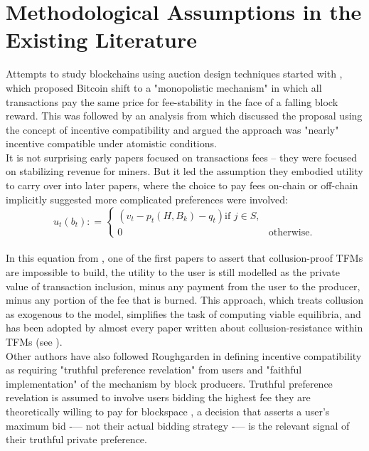 \documentclass[11pt,a4paper]{llncs}
\begin{document}
\section{Methodological Assumptions in the Existing Literature}

Attempts to study blockchains using auction design techniques started with \cite{Lavi2017RedesigningBitcoin}, which proposed Bitcoin shift to a "monopolistic mechanism" in which all transactions pay the same price for fee-stability in the face of a falling block reward. This was followed by an analysis from \cite{Yao2018IncentiveBitcoin} which discussed the proposal using the concept of incentive compatibility and argued the approach was "nearly" incentive compatible under atomistic conditions.
\vspace{0.2cm} \\
It is not surprising early papers focused on transactions fees -- they were focused on stabilizing revenue for miners. But it led the assumption they embodied utility to carry over into later papers, where the choice to pay fees on-chain or off-chain implicitly suggested more complicated preferences were involved:
\vspace{0.2cm} \\
\[
u_t\left(b_t\right) : =
\begin{cases}
\left(
        v_t - p_t\left(H,B_k\right) - q_t
\right) \text{if } j \in S, \\ 0 & \text{otherwise.}
\end{cases}
\]
\vspace{0.2cm} \\
In this equation from \cite{roughgarden2024}, one of the first papers to assert that collusion-proof TFMs are impossible to build, the utility to the user is still modelled as the private value of transaction inclusion, minus any payment from the user to the producer, minus any portion of the fee that is burned. This approach, which treats collusion as exogenous to the model, simplifies the task of computing viable equilibria, and has been adopted by almost every paper written about collusion-resistance within TFMs (see \cite{chen2022bayesian, ferreira2021dynamic, wu2023maximizing, damle2024designing, gafni2024barriers, bahrani2023transaction, bahrani2024transaction, chung2024collusion, chung2023foundations}).
\vspace{0.2cm} \\
Other authors have also followed Roughgarden in defining incentive compatibility as requiring "truthful preference revelation" from users and "faithful implementation" of the mechanism by block producers. Truthful preference revelation is assumed to involve users bidding the highest fee they are theoretically willing to pay for blockspace \cite{roughgarden2024, chung2023foundations}, a decision that asserts a user’s maximum bid -— not their actual bidding strategy -— is the relevant signal of their truthful private preference.
\end{document}
